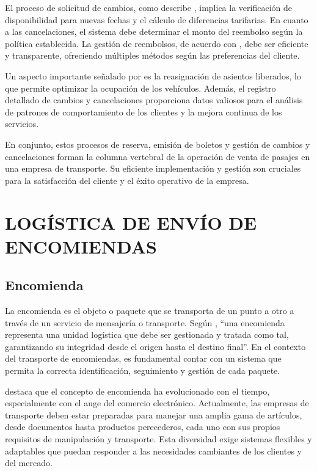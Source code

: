 		El proceso de solicitud de cambios, como describe \textcite{ramírez2015logística}, implica la verificación de disponibilidad para nuevas fechas y el cálculo de diferencias tarifarias. En cuanto a las cancelaciones, el sistema debe determinar el monto del reembolso según la política establecida. La gestión de reembolsos, de acuerdo con \textcite{garcía2016gestión}, debe ser eficiente y transparente, ofreciendo múltiples métodos según las preferencias del cliente.
		
		Un aspecto importante señalado por \textcite{rivera2002ESTUDIODL} es la reasignación de asientos liberados, lo que permite optimizar la ocupación de los vehículos. Además, el registro detallado de cambios y cancelaciones proporciona datos valiosos para el análisis de patrones de comportamiento de los clientes y la mejora continua de los servicios.
		
		En conjunto, estos procesos de reserva, emisión de boletos y gestión de cambios y cancelaciones forman la columna vertebral de la operación de venta de pasajes en una empresa de transporte. Su eficiente implementación y gestión son cruciales para la satisfacción del cliente y el éxito operativo de la empresa.
	\section{LOGÍSTICA DE ENVÍO DE ENCOMIENDAS}
	\subsection{Encomienda}
		La encomienda es el objeto o paquete que se transporta de un punto a otro a través de un servicio de mensajería o transporte. Según \textcite{stock2000strategic}, ``una encomienda representa una unidad logística que debe ser gestionada y tratada como tal, garantizando su integridad desde el origen hasta el destino final''. En el contexto del transporte de encomiendas, es fundamental contar con un sistema que permita la correcta identificación, seguimiento y gestión de cada paquete.
		
		\textcite{garcía2016gestión} destaca que el concepto de encomienda ha evolucionado con el tiempo, especialmente con el auge del comercio electrónico. Actualmente, las empresas de transporte deben estar preparadas para manejar una amplia gama de artículos, desde documentos hasta productos perecederos, cada uno con sus propios requisitos de manipulación y transporte. Esta diversidad exige sistemas flexibles y adaptables que puedan responder a las necesidades cambiantes de los clientes y del mercado.
